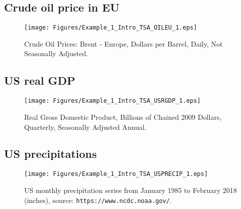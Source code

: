 \documentclass[
paper=128mm:96mm, %
fontsize=9.5pt, %
pagesize, %
parskip=half-, %
]{scrartcl} %
\theoremstyle{mythmstyle} %
\begin{document}
%
\subsection{Crude oil price in EU}
\begin{figure}[!h]
\begin{center}
%
\texttt{[image: Figures/Example\_1\_Intro\_TSA\_OILEU\_1.eps]}
%
\caption{\footnotesize{Crude Oil Prices: Brent - Europe, Dollars per Barrel, Daily, Not Seasonally Adjusted.}}
%
\label{fig:GME_Prices_12_1}
%
\end{center}
\end{figure}
%
\clearpage

%
\subsection{US real GDP}
\begin{figure}[!h]
\begin{center}
%
\texttt{[image: Figures/Example\_1\_Intro\_TSA\_USRGDP\_1.eps]}
%
\caption{\footnotesize{Real Gross Domestic Product, Billions of Chained 2009 Dollars, Quarterly, Seasonally Adjusted Annual.}}
%
\label{fig:GME_Prices_12_1}
%
\end{center}
\end{figure}
%
\clearpage

%
\subsection{US precipitations}
\begin{figure}[!h]
\begin{center}
%
\texttt{[image: Figures/Example\_1\_Intro\_TSA\_USPRECIP\_1.eps]}
%
\caption{\footnotesize{US monthly precipitation series from January 1985 to February 2018 (inches), source: \texttt{https://www.ncdc.noaa.gov/}.}}
%
\label{fig:GME_Prices_12_1}
%
\end{center}
\end{figure}
%
\clearpage
\end{document}
